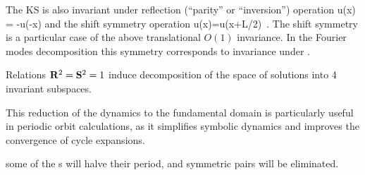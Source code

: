 The KS is also invariant under
reflection (``parity'' or ``inversion'') operation
\beq
\Refl u(x) = -u(-x)
and the shift symmetry operation 
\beq
\Shift u(x)=u(x+L/2)
\,. 
The shift symmetry is a particular case of the
above translational $O(1)$ invariance.
In the Fourier modes decomposition  this
symmetry corresponds to invariance under
.

Relations $\mathbf{R}^2=\mathbf{S}^2=1$
induce decomposition of the space of solutions into 4 invariant
subspaces.

This reduction of the dynamics to the fundamental domain is particularly
useful in periodic orbit calculations, as it simplifies symbolic dynamics
and improves the convergence of cycle expansions\cite{CvitaEckardt}.

some of the \po s will
halve their period, and symmetric pairs will be eliminated.




